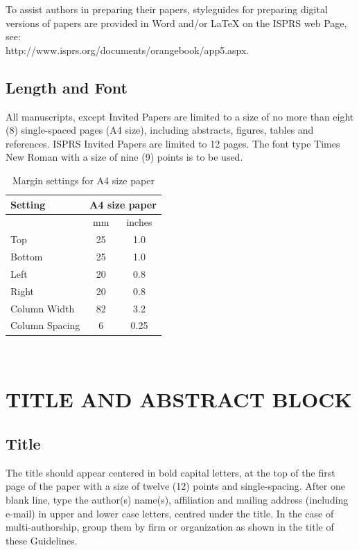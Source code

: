 \documentclass{isprs}
\begin{document}
To assist authors in preparing their papers, styleguides for preparing digital versions of papers are 
provided in Word and/or LaTeX on the ISPRS web Page, see:\\ http://www.isprs.org/documents/orangebook/app5.aspx.



\subsection{Length and Font}\label{sec:Length and Font}

All manuscripts, except Invited Papers are limited to a size of no more than eight (8) single-spaced 
pages (A4 size), including abstracts, figures, tables and references. ISPRS Invited Papers are limited 
to 12 pages. The font type Times New Roman with a size of nine (9) points is to be used.

\begin{table}[h]
	\centering
		\begin{tabular}{|l|c|c|}\hline
			Setting&\multicolumn{2}{c|}{A4 size paper}\\\hline
			  &mm&inches\\
			 Top&25&1.0\\
			 Bottom&25&1.0\\
			 Left&20&0.8\\
			 Right&20&0.8\\
			 Column Width&82&3.2\\
			 Column Spacing&6&0.25\\\hline
		\end{tabular}
	\caption{Margin settings for A4 size paper}
	\label{tab:Margin_settings}
\end{table}

~ %

\section{TITLE AND ABSTRACT BLOCK}\label{sec:TITLE AND ABSTRACT BLOCK}

\subsection{Title}\label{sec:Title}

The title should appear centered in bold capital letters, at the top of the 
first page of the paper with a size of twelve (12) points and single-spacing. 
After one blank line, type the author(s) name(s), affiliation and mailing address 
(including e-mail) in upper and lower case letters, centred under the title. In the 
case of multi-authorship, group them by firm or organization as shown in the title 
of these Guidelines. 
\end{document}
